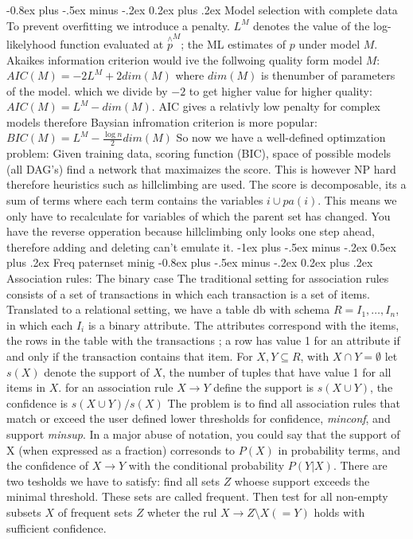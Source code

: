 \documentclass[9pt,landscape]{extarticle}
\makeatletter
\renewcommand{\section}{\@startsection{section}{1}{0mm}%
                                {-1ex plus -.5ex minus -.2ex}%
                                {0.5ex plus .2ex}%
                                {\normalfont\large\bfseries}}
\renewcommand{\subsection}{\@startsection{subsection}{2}{0mm}%
                                {-0.8ex plus -.5ex minus -.2ex}%
                                {0.2ex plus .2ex}%
                                {\normalfont\normalsize\bfseries}}
\makeatother
\begin{document}
\begin{multicols}{3}
\subsection{Model selection with complete data}
To prevent overfitting we introduce a penalty. $L^M$ denotes the value of the
log-likelyhood function evaluated at $\overset{\wedge}{p}^M$; the ML estimates
of $p$ under model $M$. Akaikes information criterion would ive the follwoing
quality form model $M$: $AIC(M)=-2L^M+2dim(M)$ where $dim(M)$ is thenumber of
parameters of the model. which we divide by $-2$ to get higher value for higher
quality: $AIC(M)=L^M-dim(M)$. AIC gives a relativly low penalty for complex
models therefore Baysian infromation criterion is more popular:
$BIC(M)=L^M-\frac{\log n}{2} dim(M)$
So now we have a well-defined optimzation problem: Given training data, scoring
function (BIC), space of possible models (all DAG's) find a network that
maximaizes the score.
This is however NP hard therefore heuristics such as hillclimbing are used.
The score is decomposable, its a sum of terms where each term contains the
variables $i \cup pa(i)$. This means we only have to recalculate for variables
of which the parent set has changed.
You have the reverse opperation because hillclimbing only looks one step ahead,
therefore adding and deleting can't emulate it.
\section{Freq paternset minig}
\subsection{Association rules: The binary case}
The traditional setting for association rules consists of a set of transactions
in which each transaction is a set of items.
Translated to a relational setting,
we have a table db with schema $R = {I_1 , \dots, I_n }$,
in which each $I_i$ is a binary attribute.
The attributes correspond with the items,
the rows in the table with the transactions
; a row has value 1 for an attribute if and only if the transaction contains
that item.
For $X,Y \subseteq R$, with $X\cap Y=\emptyset$ let $s(X)$ denote the support of
$X$, the number of tuples that have value 1 for all items in $X$. for an
association rule $X \to Y$ define the support is $s(X\cup Y)$, the confidence is
$s(X\cup Y)/s(X)$
The problem is to find all association rules that match or exceed the user
defined lower thresholds for confidence, \emph{minconf}, and support
\emph{minsup}.
In a major abuse of notation,
you could say that the support of X (when expressed as a fraction) corresonds
to $P (X)$ in probability terms,
and the confidence of $X \to Y$ with the conditional probability $P (Y | X)$.
There are two tesholds we have to satisfy:
find all sets $Z$ whoese support exceeds the minimal threshold. These sets are
called frequent. Then test for all non-empty subsets $X$ of frequent sets $Z$
wheter the rul $X \to Z \setminus X(=Y)$ holds with sufficient confidence.

\end{multicols}
\end{document}
